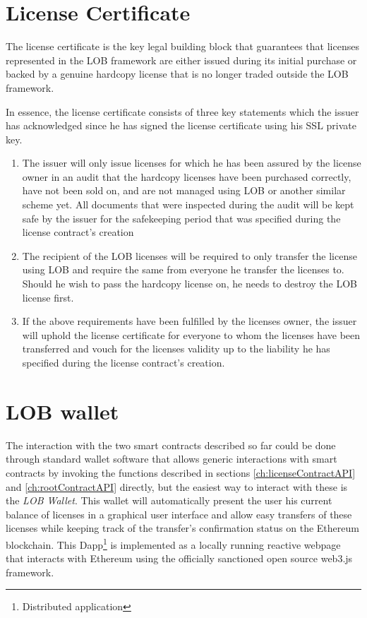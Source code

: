 \documentclass[a4paper]{article}
\begin{document}
\section{License Certificate}
\label{ch:licenseCertificate}

The license certificate is the key legal building block that guarantees that licenses represented in the LOB framework are either issued during its initial purchase or backed by a genuine hardcopy license that is no longer traded outside the LOB framework.

In essence, the license certificate consists of three key statements which the issuer has acknowledged since he has signed the license certificate using his SSL private key.

\begin{enumerate}
  \item The issuer will only issue licenses for which he has been assured by the license owner in an audit that the hardcopy licenses have been purchased correctly, have not been sold on, and are not managed using LOB or another similar scheme yet. All documents that were inspected during the audit will be kept safe by the issuer for the safekeeping period that was specified during the license contract's creation
  \item The recipient of the LOB licenses will be required to only transfer the license using LOB and require the same from everyone he transfer the licenses to. Should he wish to pass the hardcopy license on, he needs to destroy the LOB license first.
  \item If the above requirements have been fulfilled by the licenses owner, the issuer will uphold the license certificate for everyone to whom the licenses have been transferred and vouch for the licenses validity up to the liability he has specified during the license contract's creation.
\end{enumerate}



\section{LOB wallet}
\label{ch:wallet}

The interaction with the two smart contracts described so far could be done through standard wallet software that allows generic interactions with smart contracts by invoking the functions described in sections \ref{ch:licenseContractAPI} and \ref{ch:rootContractAPI} directly, but the easiest way to interact with these is the \emph{LOB Wallet}. This wallet will automatically present the user his current balance of licenses in a graphical user interface and allow easy transfers of these licenses while keeping track of the transfer's confirmation status on the Ethereum blockchain. This Dapp\footnote{Distributed application} is implemented as a locally running reactive webpage that interacts with Ethereum using the officially sanctioned open source web3.js framework.
\end{document}
